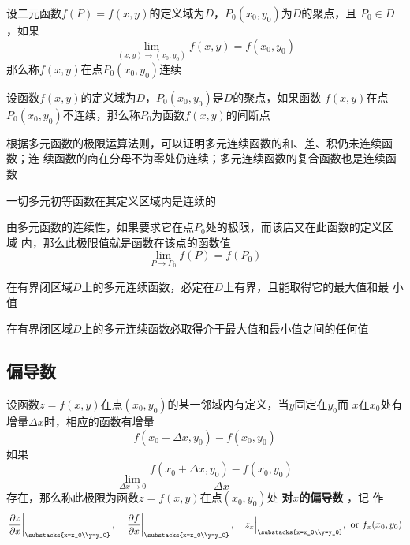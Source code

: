 \documentclass[11pt]{article}
\begin{document}
\begin{definition}[]
设二元函数\(f(P)=f(x,y)\)的定义域为\(D\)，\(P_0(x_0,y_0)\)为\(D\)的聚点，且
\(P_0\in D\)，如果
\begin{equation*}
\lim_{(x,y)\to(x_0,y_0)}f(x,y)=f(x_0,y_0)
\end{equation*}
那么称\(f(x,y)\)在点\(P_0(x_0,y_0)\)连续
\end{definition}

\begin{definition}[]
设函数\(f(x,y)\)的定义域为\(D\)，\(P_0(x_0,y_0)\)是\(D\)的聚点，如果函数
\(f(x,y)\)在点\(P_0(x_0,y_0)\)不连续，那么称\(P_0\)为函数\(f(x,y)\)的间断点
\end{definition}

根据多元函数的极限运算法则，可以证明多元连续函数的和、差、积仍未连续函数；连
续函数的商在分母不为零处仍连续；多元连续函数的复合函数也是连续函数

一切多元初等函数在其定义区域内是连续的

由多元函数的连续性，如果要求它在点\(P_0\)处的极限，而该店又在此函数的定义区域
内，那么此极限值就是函数在该点的函数值
\begin{equation*}
\lim_{P\to P_0}f(P)=f(P_0)
\end{equation*}

\begin{proposition}[有界性与最大值最小值定理]
在有界闭区域\(D\)上的多元连续函数，必定在\(D\)上有界，且能取得它的最大值和最
小值
\end{proposition}

\begin{proposition}[介值定理]
在有界闭区域\(D\)上的多元连续函数必取得介于最大值和最小值之间的任何值
\end{proposition}
\subsection{偏导数}
\label{sec:org8bcbe40}
\begin{definition}[]
设函数\(z=f(x,y)\)在点\((x_0,y_0)\)的某一邻域内有定义，当\(y\)固定在\(y_0\)而
\(x\)在\(x_0\)处有增量\(\Delta x\)时，相应的函数有增量
\begin{equation*}
f(x_0+\Delta x,y_0)-f(x_0,y_0)
\end{equation*}
如果
\begin{equation*}
\lim_{\Delta x\to0}\frac{f(x_0+\Delta x,y_0)-f(x_0,y_0)}{\Delta x}
\end{equation*}
存在，那么称此极限为函数\(z=f(x,y)\)在点\((x_0,y_0)\)处 \textbf{对\(x\)的偏导数} ，记
作
\begin{equation*}
\left.\frac{\partial z}{\partial x}\right\rvert_{\substacks{x=x_0\\y=y_0}},\quad
\left.\frac{\partial f}{\partial x}\right\rvert_{\substacks{x=x_0\\y=y_0}},\quad
z_x\Big\rvert_{\substacks{x=x_0\\y=y_0}},\text{ or }
f_x(x_0,y_0)
\end{equation*}
\end{definition}
\end{document}
